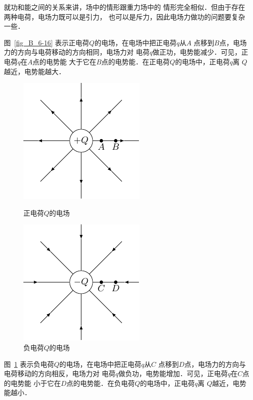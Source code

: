 就功和能之间的关系来讲，场中的情形跟重力场中的
情形完全相似．但由于存在两种电荷，电场力既可以是引力，
也可以是斥力，因此电场力做功的问题要复杂一些．

图~\ref{fig_B_6-16} 表示正电荷$Q$的电场，在电场中把正电荷$q$从$A$
点移到$B$点，电场力的方向与电荷移动的方向相同，电场力对
电荷$q$做正功，电势能减少．可见，正电荷$q$在$A$点的电势能
大于它在$B$点的电势能．在正电荷$Q$的电场中，正电荷$q$离
$Q$越近，电势能越大．
\begin{figure}[htbp]
    \centering
    \begin{minipage}[t]{0.48\textwidth}
        \centering
        \includegraphics{fig/B/6-16.pdf}
        \caption{正电荷$Q$的电场}\label{fig_B_6-17}
    \end{minipage}
    \begin{minipage}[t]{0.48\textwidth}
        \centering
        \includegraphics{fig/B/6-17.pdf}
        \caption{负电荷$Q$的电场}\label{fig_B_6-17}
    \end{minipage}
\end{figure}

图~\ref{fig_B_6-17} 表示负电荷$Q$的电场，在电场中把正电荷$q$从$C$
点移到$D$点，电场力的方向与电荷移动的方向相反，电场力对
电荷$q$做负功，电势能增加．可见，正电荷$q$在$C$点的电势能
小于它在$D$点的电势能．在负电荷$Q$的电场中，正电荷$q$离
$Q$越近，电势能越小．

